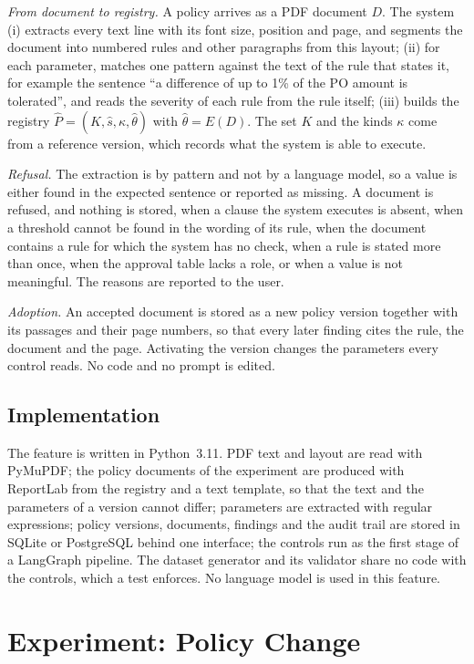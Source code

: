 \documentclass[conference]{IEEEtran}
\begin{document}
\textit{From document to registry.} A policy arrives as a PDF document $D$. The system (i) extracts every text line with its font size, position and page, and segments the document into numbered rules and other paragraphs from this layout; (ii) for each parameter, matches one pattern against the text of the rule that states it, for example the sentence ``a difference of up to 1\% of the PO amount is tolerated'', and reads the severity of each rule from the rule itself; (iii) builds the registry $\hat{P}=(K,\hat{s},\kappa,\hat{\theta})$ with $\hat{\theta}=E(D)$. The set $K$ and the kinds $\kappa$ come from a reference version, which records what the system is able to execute.

\textit{Refusal.} The extraction is by pattern and not by a language model, so a value is either found in the expected sentence or reported as missing. A document is refused, and nothing is stored, when a clause the system executes is absent, when a threshold cannot be found in the wording of its rule, when the document contains a rule for which the system has no check, when a rule is stated more than once, when the approval table lacks a role, or when a value is not meaningful. The reasons are reported to the user.

\textit{Adoption.} An accepted document is stored as a new policy version together with its passages and their page numbers, so that every later finding cites the rule, the document and the page. Activating the version changes the parameters every control reads. No code and no prompt is edited.

\subsection{Implementation}
The feature is written in Python~3.11. PDF text and layout are read with PyMuPDF; the policy documents of the experiment are produced with ReportLab from the registry and a text template, so that the text and the parameters of a version cannot differ; parameters are extracted with regular expressions; policy versions, documents, findings and the audit trail are stored in SQLite or PostgreSQL behind one interface; the controls run as the first stage of a LangGraph pipeline. The dataset generator and its validator share no code with the controls, which a test enforces. No language model is used in this feature.

\section{Experiment: Policy Change}
\label{sec:policyexp}
\end{document}
